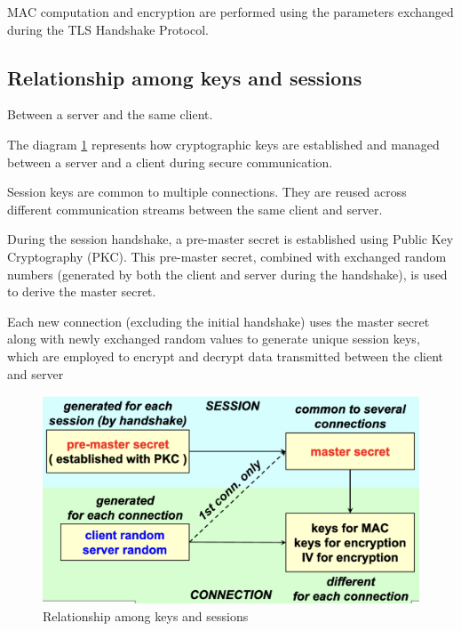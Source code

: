 \begin{tcolorbox}[colback=red!10!white, colframe=red!70!black, coltitle=white, title=Beware]
    MAC computation and encryption are performed using the parameters exchanged during the TLS Handshake Protocol.
\end{tcolorbox}

\subsection*{Relationship among keys and sessions}
\begin{center}
    Between a server and the same client.
\end{center}

The diagram \ref{fig:rel_keys} represents how cryptographic keys are established and managed between a server and a client during secure communication.

\begin{tcolorbox}[colback=blue!10!white, colframe=blue!50!white, title=Reminder]
    Session keys are common to multiple connections. They are reused across different communication streams between the same client and server.
\end{tcolorbox}
During the session handshake, a pre-master secret is established using Public Key Cryptography (PKC). This pre-master secret, combined with exchanged random numbers (generated by both the client and server during the handshake), is used to derive the master secret. 

\vspace{0.5cm}

Each new connection (excluding the initial handshake) uses the master secret along with newly exchanged random values to generate unique session keys, which are employed to encrypt and decrypt data transmitted between the client and server

\begin{figure}[H]
    \centering
    \includegraphics[width=0.6\linewidth]{Images/Appsec/rel_keys.png}
    \caption{Relationship among keys and sessions}
    \label{fig:rel_keys}
\end{figure}

